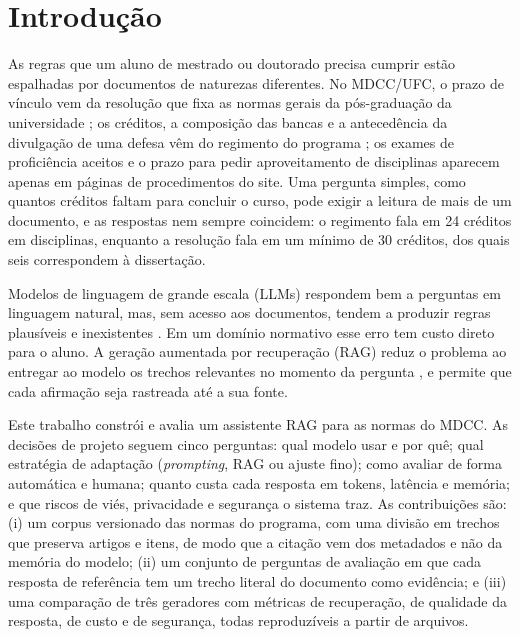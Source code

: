 \documentclass{sbc-template}
\begin{document}

\section{Introdução}
\label{sec:introducao}

As regras que um aluno de mestrado ou doutorado precisa cumprir estão espalhadas por
documentos de naturezas diferentes. No MDCC/UFC, o prazo de vínculo vem da resolução
que fixa as normas gerais da pós-graduação da universidade \cite{UFC2015}; os créditos,
a composição das bancas e a antecedência da divulgação de uma defesa vêm do regimento
do programa \cite{MDCC2016}; os exames de proficiência aceitos e o prazo para pedir
aproveitamento de disciplinas aparecem apenas em páginas de procedimentos do site. Uma
pergunta simples, como quantos créditos faltam para concluir o curso, pode exigir a
leitura de mais de um documento, e as respostas nem sempre coincidem: o regimento fala
em 24 créditos em disciplinas, enquanto a resolução fala em um mínimo de 30 créditos,
dos quais seis correspondem à dissertação.

Modelos de linguagem de grande escala (LLMs) respondem bem a perguntas em linguagem
natural, mas, sem acesso aos documentos, tendem a produzir regras plausíveis e
inexistentes \cite{Ji2023}. Em um domínio normativo esse erro tem custo direto para o
aluno. A geração aumentada por recuperação (RAG) reduz o problema ao entregar ao modelo
os trechos relevantes no momento da pergunta \cite{Lewis2020,Gao2023}, e permite que
cada afirmação seja rastreada até a sua fonte.

Este trabalho constrói e avalia um assistente RAG para as normas do MDCC. As decisões
de projeto seguem cinco perguntas: qual modelo usar e por quê; qual estratégia de
adaptação (\textit{prompting}, RAG ou ajuste fino); como avaliar de forma automática e
humana; quanto custa cada resposta em tokens, latência e memória; e que riscos de
viés, privacidade e segurança o sistema traz. As contribuições são:
(i) um corpus versionado das normas do programa, com uma divisão em trechos que
preserva artigos e itens, de modo que a citação vem dos metadados e não da memória do
modelo; (ii) um conjunto de perguntas de avaliação em que cada resposta de referência
tem um trecho literal do documento como evidência; e (iii) uma comparação de três
geradores com métricas de recuperação, de qualidade da resposta, de custo e de
segurança, todas reproduzíveis a partir de arquivos.
\end{document}

